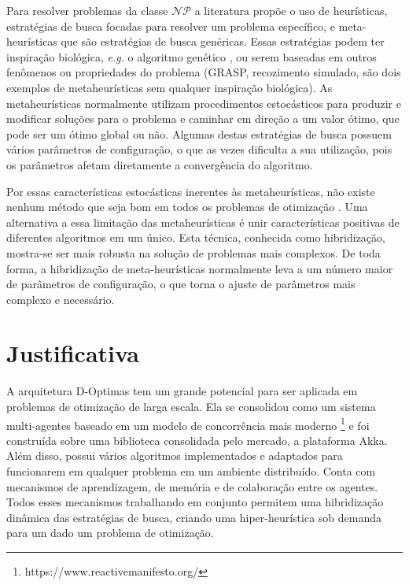 Para resolver problemas da classe $\mathcal{NP}$ a literatura propõe o uso de heurísticas, estratégias de busca focadas para resolver um problema específico, e meta-heurísticas que são estratégias de busca genéricas. Essas estratégias podem ter inspiração biológica, \textit{e.g.} o algoritmo genético \cite{whitley1994}, ou serem baseadas em outros fenômenos ou propriedades do problema (GRASP, recozimento simulado, são dois exemplos de metaheurísticas sem qualquer inspiração biológica). As  metaheurísticas normalmente utilizam procedimentos estocásticos para produzir e modificar soluções para o problema e caminhar em direção a um valor ótimo, que pode ser um ótimo global ou não. Algumas destas estratégias de busca possuem vários parâmetros de configuração, o que as vezes dificulta a sua utilização, pois os parâmetros afetam diretamente a convergência do algoritmo. 

Por essas características estocásticas inerentes às metaheurísticas, não existe nenhum método que seja bom em todos os problemas de otimização \cite[p. 30-32]{eiben2015}\cite{wolpert1997}. Uma alternativa a essa limitação das metaheurísticas é unir características positivas de diferentes algoritmos em um único. Esta técnica, conhecida como hibridização, mostra-se ser mais robusta na solução de problemas mais complexos. De toda forma, a hibridização de meta-heurísticas normalmente leva a um número maior de parâmetros de configuração, o que torna o ajuste de parâmetros mais complexo e necessário.


\section{Justificativa}

A arquitetura D-Optimas tem um grande potencial para ser aplicada em problemas de otimização de larga escala. Ela se consolidou como um sistema multi-agentes baseado em um modelo de concorrência mais moderno \footnote{https://www.reactivemanifesto.org/} e foi construída sobre uma biblioteca consolidada pelo mercado, a plataforma Akka. Além disso, possui vários algoritmos implementados e adaptados para funcionarem em qualquer problema em um ambiente distribuído. Conta com mecanismos de aprendizagem, de memória e de colaboração entre os agentes. Todos esses mecanismos trabalhando em conjunto permitem uma hibridização dinâmica das estratégias de busca, criando uma hiper-heurística sob demanda para um dado um problema de otimização.

